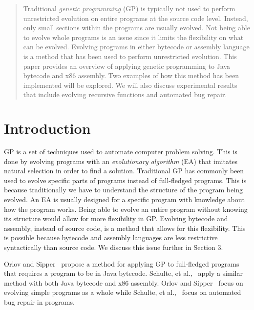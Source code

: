 \documentclass{sig-alternate}
\begin{document}
\maketitle
\begin{abstract}
Traditional \textit{genetic programming} (GP) is typically not used to perform unrestricted evolution on entire programs at the source code level. Instead, only small sections within the programs are usually evolved. Not being able to evolve whole programs is an issue since it limits the flexibility on what can be evolved. Evolving programs in either bytecode or assembly language is a method that has been used to perform unrestricted evolution. This paper provides an overview of applying genetic programming to Java bytecode and x86 assembly. Two examples of how this method has been implemented will be explored. We will also discuss experimental results that include evolving recursive functions and automated bug repair.
\end{abstract}



\section{Introduction}
GP is a set of techniques used to automate computer problem solving. This is done by evolving programs with an \textit{evolutionary algorithm} (EA) that imitates natural selection in order to find a solution. Traditional GP has commonly been used to evolve specific parts of programs instead of full-fledged programs. This is because traditionally we have to understand the structure of the program being evolved. An EA is usually designed for a specific program with knowledge about how the program works. Being able to evolve an entire program without knowing its structure would allow for more flexibility in GP. Evolving bytecode and assembly, instead of source code, is a method that allows for this flexibility. This is possible because bytecode and assembly languages are less restrictive syntactically than source code. We discuss this issue further in Section 3.\par 

Orlov and Sipper~\cite{FINCH2:2009} propose a method for applying GP to full-fledged programs that requires a program to be in Java bytecode. Schulte, et al.,~\cite{Assembly:2010} apply a similar method with both Java bytecode and x86 assembly. Orlov and Sipper~\cite{FINCH:2011} focus on evolving simple programs as a whole while Schulte, et al.,~\cite{Assembly:2010} focus on automated bug repair in programs.\par
	
\end{document}
